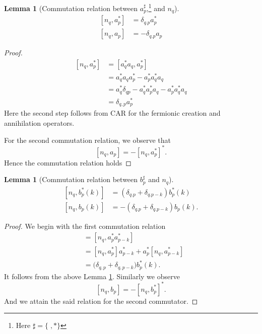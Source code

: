 \documentclass[sn-mathphys,Numbered, a4paper ,nocrop]{sn-jnl}%
\newcommand{\com}[1]{\left[ #1 \right]}
\theoremstyle{plain}
\newtheorem{lemma}[theorem]{Lemma}
\theoremstyle{definition}
\theoremstyle{remark}
\theoremstyle{plain}
\theoremstyle{definition}
\theoremstyle{remark}
\begin{document}
\begin{lemma}[Commutation relation between $a^\sharp_p$,\footnote{Here $\sharp = \{\;,*\} $} and $n_q$]\label{lem:coman}
    \begin{align}
        \com{n_q,a^*_p} &= \delta_{q.p}a^*_p\\
        \com{n_q,a_p} &= -\delta_{q.p}a_p
    \end{align}
\end{lemma} 
\begin{proof}
    \begin{align}
        \com{n_q,a^*_p} &= \com{a^*_qa_q,a^*_p}\nonumber\\
        &=a^*_qa_qa^*_p - a^*_pa^*_qa_q\nonumber\\
        &= a^*_q\delta_{qp}- a^*_qa^*_pa_q - a^*_pa^*_qa_q\nonumber\\
        &=\delta_{q,p}a^*_p
    \end{align}
    Here the second step follows from CAR for the fermionic creation and annihilation operators.
    
For the second commutation relation, we observe that 
    \begin{equation}
        \com{n_q,a_p}= -\com{n_q,a^*_p}^*.
    \end{equation}
Hence the commutation relation holds
\end{proof}
\begin{lemma}[Commutation relation between $b^\sharp_p$ and $n_q$]
    \begin{align}
        \com{n_q,b^*_p(k)} &= \left(\delta_{q.p}+\delta_{q.p-k}\right)b^*_p(k)\\
        \com{n_q,b_p(k)} &= -\left(\delta_{q.p}+\delta_{q.p-k}\right)b_p(k).
    \end{align}
\end{lemma} 
\begin{proof} We begin with the first commutation relation
    \begin{align}
        [n_q,b^*_p(k)] &= [n_q,a^*_pa^*_{p-k}]\\
        &=[n_q,a^*_p]a^*_{p-k}+a^*_p[n_q,a^*_{p-k}]\\
        &=\big(\delta_{q,p} +\delta_{q,p-k}\big)b^*_p(k).
    \end{align}
    It follows from the above Lemma \ref{lem:coman}. Similarly we observe
    \begin{equation}
         \com{n_q,b_p}= -\com{n_q,b^*_p}^*.
    \end{equation}
    And we attain the said relation for the second commutator.
\end{proof}
\end{document}
